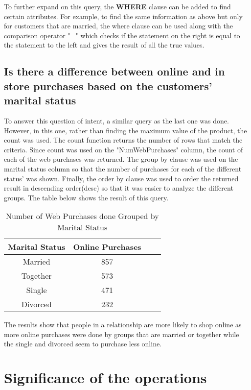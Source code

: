 \documentclass{article}
\begin{document}
To further expand on this query, the \textbf{WHERE} clause can be added to find certain attributes. For example, to find the same information as above but only for customers that are married, the where clause can be used along with the comparison operator "=" which checks if the statement on the right is equal to the statement to the left and gives the result of all the true values. 

\subsection{Is there a difference between online and in store purchases based on the customers' marital status}

To answer this question of intent, a similar query as the last one was done. However, in this one, rather than finding the maximum value of the product, the count was used. The count function returns the number of rows that match the criteria. Since count was used on the "NumWebPurchases" column, the count of each of the web purchases was returned. The group by clause was used on the marital status column so that the number of purchases for each of the different status' was shown. Finally, the order by clause was used to order the returned result in descending order(desc) so that it was easier to analyze the different groups. The table below shows the result of this query. 


\begin{table}[h]
	\centering
	\caption{Number of Web Purchases done Grouped by Marital Status}
	\label{table2}
	\begin{tabular}{@{}cccc@{}}
		\toprule
		\textbf{Marital Status }& \textbf{Online Purchases } \\
		\midrule
		Married & 857  \\
  	  Together & 573  \\
		Single & 471  \\
		Divorced & 232   \\

		\bottomrule
	\end{tabular}
\end{table}

The results show that people in a relationship are more likely to shop online as more online purchases were done by groups that are married or together while the single and divorced seem to purchase less online. 



\section{Significance of the operations}
\end{document}
